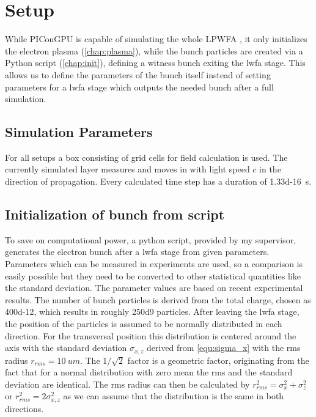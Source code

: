 \documentclass[bachelor_thesis]{subfiles}
\begin{document}
\chapter{Setup}
While PIConGPU is capable of simulating the whole LPWFA , it only initializes the electron plasma (\autoref{chap:plasma}), while the bunch particles are created via a Python script (\autoref{chap:init}), defining a witness bunch exiting the \gls{lwfa} stage.
This allows us to define the parameters of the bunch itself instead of setting parameters for a \gls{lwfa} stage which outputs the needed bunch after a full simulation.


\section{Simulation Parameters}
For all setups a box consisting of  grid cells for field calculation is used. The currently simulated layer measures  and moves in with light speed $c$ in the direction of propagation.
Every calculated time step has a duration of \qty{1.33d-16}{\s}. 


\section{Initialization of bunch from script}\label{chap:init}
To save on computational power, a python script, provided by my supervisor, generates the electron bunch after a \gls{lwfa} stage from given parameters. Parameters which can be measured in experiments are used,
so a comparison is easily possible but they need to be converted to other statistical quantities like the standard deviation. The parameter values are based on recent experimental results\cite{Kurz2021, Schoebel2022, Cabadag2021}.
The number of bunch particles is derived from the total charge, chosen as \qty{400d-12}{\C}, which results in roughly \num{250d9} particles. After leaving the \gls{lwfa} stage, the position of the particles is assumed to be normally distributed in each direction.
For the transversal position this distribution is centered around the axis with the standard deviation $\sigma_{x,z}$ derived from \autoref{equ:sigma_x} with the \gls{rms} radius $r_{rms}=\qty{10}{um}$.
The $1/\sqrt{2}$ factor is a geometric factor, originating from the fact that for a normal distribution with zero mean the \gls{rms} and the standard deviation are identical. 
The \gls{rms} radius can then be calculated by $r_{rms}^2=\sigma_{x}^2 + \sigma_{z}^2$ or  $r_{rms}^2=2\sigma_{x,z}^2$ as we can assume that the distribution is the same in both directions.
\end{document}
